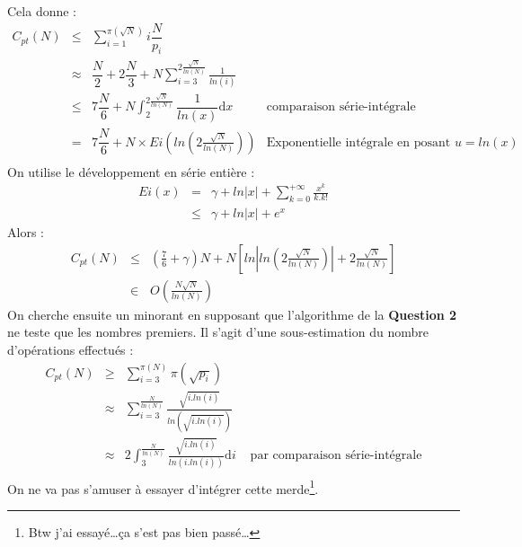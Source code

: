 \documentclass[../main.tex]{subfiles}
\begin{document}
Cela donne :
$$\begin{array}{lcll}
C_{pt}(N) & \leq & \displaystyle\sum_{i = 1}^{\pi(\sqrt{N})}i\dfrac{N}{p_i} \\
& \approx & \dfrac{N}{2} + 2\dfrac{N}{3} + N\displaystyle\sum_{i = 3}^{2\frac{\sqrt{N}}{ln(N)}}\frac{1}{ln(i)} \\
& \leq & 7\dfrac{N}{6} + N\displaystyle\int_{2}^{2\frac{\sqrt{N}}{ln(N)}}\dfrac{1}{ln(x)}\mathrm{d}x & \text{comparaison série-intégrale}\\
& = & 7\dfrac{N}{6} + N\times Ei\left(ln\left(2\frac{\sqrt{N}}{ln(N)}\right)\right) & \text{Exponentielle intégrale en posant $u = ln(x)$} \\
\end{array}$$
On utilise le développement en série entière :
$$\begin{array}{lcl}Ei(x) & = & \gamma + ln|x| + \displaystyle\sum_{k = 0}^{+\infty}\frac{x^k}{k.k!} \\
& \leq & \gamma + ln|x| + e^x
\end{array}$$
Alors :
$$\begin{array}{lcl}C_{pt}(N) & \leq & (\frac{7}{6} + \gamma)N + N\left[ln\left|ln\left(2\frac{\sqrt{N}}{ln(N)}\right)\right| + 2\frac{\sqrt{N}}{ln(N)}\right] \\
& \in & O\left(\frac{N\sqrt{N}}{ln(N)}\right)
\end{array}$$
On cherche ensuite un minorant en supposant que l'algorithme de la \textbf{Question 2} ne teste que les nombres premiers. Il s'agit d'une sous-estimation du nombre d'opérations effectués :
$$\begin{array}{lcll}
C_{pt}(N) & \geq & \displaystyle\sum_{i = 3}^{\pi(N)}\pi(\sqrt{p_i}) \\
 & \approx & \displaystyle\sum_{i = 3}^{\frac{N}{ln(N)}}\frac{\sqrt{i.ln(i)}}{ln(\sqrt{i.ln(i)})} \\
& \approx & 2\displaystyle\int_{3}^{\frac{N}{ln(N)}} \frac{\sqrt{i.ln(i)}}{ln(i.ln(i))}\mathrm{d}i& \text{ par comparaison série-intégrale}\\
\end{array}$$
On ne va pas s'amuser à essayer d'intégrer cette merde\footnote{Btw j'ai essayé\dots ça s'est pas bien passé\dots}.
\end{document}
